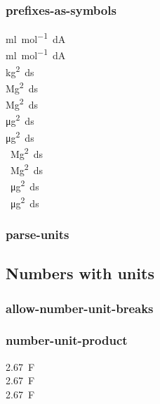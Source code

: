 \documentclass{article}
\begin{document}
\subsubsection{prefixes-as-symbols}
\si{\milli\litre\per\mole\deci\ampere} \\
\si[prefixes-as-symbols=false]{\milli\litre\per\mole\deci\ampere}\\
\si[prefixes-as-symbols=false]{\kilo\gram\squared\deci\second}\\
\si{\mega\gram\squared\deci\second}\\
\si[prefixes-as-symbols=false]{\mega\gram\squared\deci\second}\\
\si{\micro\gram\squared\deci\second}\\
\si[prefixes-as-symbols=false]{\micro\gram\squared\deci\second}\\
\si{\per\mega\gram\squared\deci\second}\\
\si[prefixes-as-symbols=false]{\per\mega\gram\squared\deci\second}\\
\si{\per\micro\gram\squared\deci\second}\\
\si[prefixes-as-symbols=false]{\per\micro\gram\squared\deci\second}\\

\subsubsection{parse-units}

\subsection{Numbers with units}
\subsubsection{allow-number-unit-breaks}
\subsubsection{number-unit-product}
\SI{2.67}{\farad} \\
\SI[number-unit-product = \ ]{2.67}{\farad} \\
\SI[number-unit-product = ]{2.67}{\farad}\\
\end{document}
